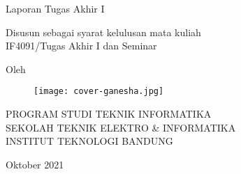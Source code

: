 \clearpage
\pagestyle{empty}

\begin{center}
    \smallskip
    
    \Large \bfseries \MakeUppercase{\thetitle}
    \vfill
    
    \Large Laporan Tugas Akhir I
    \vfill
    
    \large Disusun sebagai syarat kelulusan mata kuliah \\
    IF4091/Tugas Akhir I dan Seminar
    \vfill
    
    \large Oleh
    
    \Large \theauthor
    
    \vfill
    \begin{figure}[h]
        \centering
        \texttt{[image: cover-ganesha.jpg]}
    \end{figure}
    \vfill
    
    \large
    \uppercase{
        Program Studi Teknik Informatika \\
        Sekolah Teknik Elektro \& Informatika \\
        Institut Teknologi Bandung
    }
    
    Oktober 2021
    
\end{center}

\clearpage
